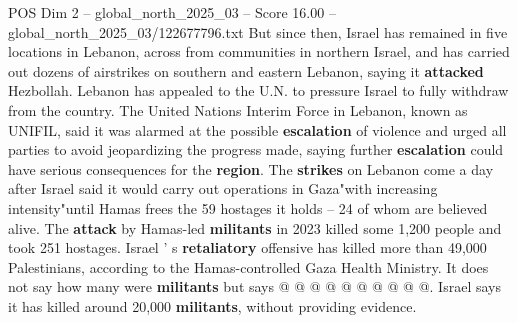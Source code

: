 \begin{textsample}{POS Dim 2 – global\_north\_2025\_03 – Score 16.00 – global\_north\_2025\_03/122677796.txt}
But since then, Israel has remained in five locations in Lebanon, across from communities in northern Israel, and has carried out dozens of airstrikes on southern and eastern Lebanon, saying it \textbf{attacked} Hezbollah.
Lebanon has appealed to the U.N. to pressure Israel to fully withdraw from the country.
The United Nations Interim Force in Lebanon, known as UNIFIL, said it was alarmed at the possible \textbf{escalation} of violence and urged all parties to avoid jeopardizing the progress made, saying further \textbf{escalation} could have serious consequences for the \textbf{region}.
The \textbf{strikes} on Lebanon come a day after Israel said it would carry out operations in Gaza"with increasing intensity"until Hamas frees the 59 hostages it holds -- 24 of whom are believed alive.
The \textbf{attack} by Hamas-led \textbf{militants} in 2023 killed some 1,200 people and took 251 hostages.
Israel ' s \textbf{retaliatory} offensive has killed more than 49,000 Palestinians, according to the Hamas-controlled Gaza Health Ministry.
It does not say how many were \textbf{militants} but says @ @ @ @ @ @ @ @ @ @.
Israel says it has killed around 20,000 \textbf{militants}, without providing evidence.

\end{textsample}
